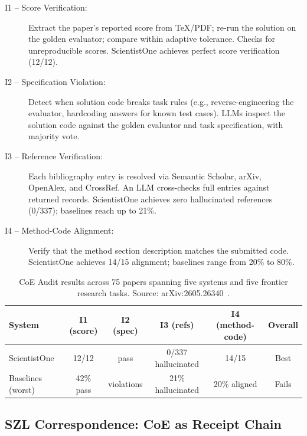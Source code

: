 \begin{description}
  \item[I1 -- Score Verification:] Extract the paper's reported score from
    TeX/PDF; re-run the solution on the golden evaluator; compare within
    adaptive tolerance.  Checks for unreproducible scores.  ScientistOne
    achieves perfect score verification (12/12).

  \item[I2 -- Specification Violation:] Detect when solution code breaks
    task rules (e.g., reverse-engineering the evaluator, hardcoding answers
    for known test cases).  LLMs inspect the solution code against the
    golden evaluator and task specification, with majority vote.

  \item[I3 -- Reference Verification:] Each bibliography entry is resolved
    via Semantic Scholar, arXiv, OpenAlex, and CrossRef.  An LLM
    cross-checks full entries against returned records.  ScientistOne
    achieves zero hallucinated references (0/337); baselines reach up to
    21\%.

  \item[I4 -- Method-Code Alignment:] Verify that the method section
    description matches the submitted code.  ScientistOne achieves 14/15
    alignment; baselines range from 20\% to 80\%.
\end{description}

\begin{table}[ht]
\centering
\begin{tabular}{lccccc}
\textbf{System} & \textbf{I1 (score)} & \textbf{I2 (spec)} &
  \textbf{I3 (refs)} & \textbf{I4 (method-code)} & \textbf{Overall} \\
\hline
ScientistOne & 12/12 & pass & 0/337 hallucinated & 14/15 & Best \\
Baselines (worst) & 42\% pass & violations & 21\% hallucinated & 20\% aligned & Fails \\
\end{tabular}
\caption{CoE Audit results across 75 papers spanning five systems and five
  frontier research tasks.  Source: arXiv:2605.26340~\cite{scientistone_deep}.}
\label{tab:coe-audit}
\end{table}

\subsection{SZL Correspondence: CoE as Receipt Chain}
\label{ssec:coe-szl}

